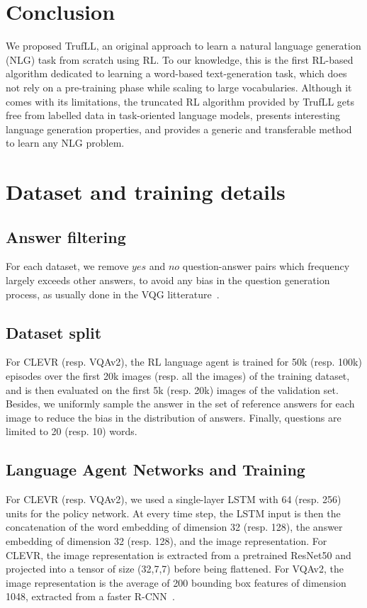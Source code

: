 \documentclass{article}
\newcommand{\algo}{TrufLL\xspace}
\begin{document}
\section{Conclusion}
\label{sec:conclusion}
We proposed \algo, an original approach to learn a natural language generation (NLG) task from scratch using RL. To our knowledge, this is the first RL-based algorithm dedicated to learning a word-based text-generation task, which does not rely on a pre-training phase while scaling to large vocabularies. Although it comes with its limitations, the truncated RL algorithm provided by \algo gets free from labelled data in task-oriented language models, presents interesting language generation properties, and provides a generic and transferable method to learn any NLG problem. 



\appendix

\section{Dataset and training details}

\subsection{Answer filtering}
For each dataset, we remove $yes$ and $no$ question-answer pairs which frequency largely exceeds other answers, to avoid any bias in the question generation process, as usually done in the VQG litterature~\citep{mostafazadeh2016generating}.

\subsection{Dataset split}
For CLEVR (resp. VQAv2), the RL language agent is trained for 50k (resp. 100k) episodes over the first 20k images (resp. all the images) of the training dataset, and is then evaluated on the first 5k (resp. 20k) images of the validation set. Besides, we uniformly sample the answer in the set of reference answers for each image to reduce the bias in the distribution of answers. Finally, questions are limited to 20 (resp. 10) words.

\subsection{Language Agent Networks and Training}
\label{sec:app:hyperparamenters}
For CLEVR (resp. VQAv2),  we used a single-layer LSTM with 64 (resp. 256) units for the policy network. At every time step, the LSTM input is then the concatenation of the word embedding of dimension 32 (resp. 128), the answer embedding of dimension 32 (resp. 128), and the image representation. For CLEVR, the image representation is extracted from a pretrained ResNet50 and projected into a tensor of size (32,7,7) before being flattened. For VQAv2, the image representation is the average of 200 bounding box features of dimension 1048, extracted from a faster R-CNN~\citep{ren2015faster}. 
\end{document}
